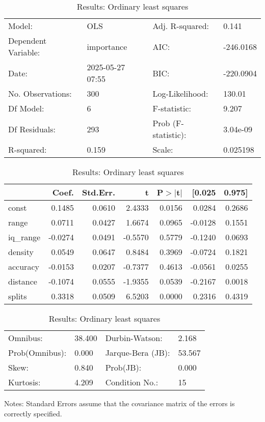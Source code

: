 \begin{table}
\caption{Results: Ordinary least squares}
\label{}
\begin{center}
\begin{tabular}{llll}
\hline
Model:              & OLS              & Adj. R-squared:     & 0.141      \\
Dependent Variable: & importance       & AIC:                & -246.0168  \\
Date:               & 2025-05-27 07:55 & BIC:                & -220.0904  \\
No. Observations:   & 300              & Log-Likelihood:     & 130.01     \\
Df Model:           & 6                & F-statistic:        & 9.207      \\
Df Residuals:       & 293              & Prob (F-statistic): & 3.04e-09   \\
R-squared:          & 0.159            & Scale:              & 0.025198   \\
\hline
\end{tabular}
\end{center}

\begin{center}
\begin{tabular}{lrrrrrr}
\hline
          &   Coef. & Std.Err. &       t & P$> |$t$|$ &  [0.025 & 0.975]  \\
\hline
const     &  0.1485 &   0.0610 &  2.4333 &      0.0156 &  0.0284 & 0.2686  \\
range     &  0.0711 &   0.0427 &  1.6674 &      0.0965 & -0.0128 & 0.1551  \\
iq\_range & -0.0274 &   0.0491 & -0.5570 &      0.5779 & -0.1240 & 0.0693  \\
density   &  0.0549 &   0.0647 &  0.8484 &      0.3969 & -0.0724 & 0.1821  \\
accuracy  & -0.0153 &   0.0207 & -0.7377 &      0.4613 & -0.0561 & 0.0255  \\
distance  & -0.1074 &   0.0555 & -1.9355 &      0.0539 & -0.2167 & 0.0018  \\
splits    &  0.3318 &   0.0509 &  6.5203 &      0.0000 &  0.2316 & 0.4319  \\
\hline
\end{tabular}
\end{center}

\begin{center}
\begin{tabular}{llll}
\hline
Omnibus:       & 38.400 & Durbin-Watson:    & 2.168   \\
Prob(Omnibus): & 0.000  & Jarque-Bera (JB): & 53.567  \\
Skew:          & 0.840  & Prob(JB):         & 0.000   \\
Kurtosis:      & 4.209  & Condition No.:    & 15      \\
\hline
\end{tabular}
\end{center}
\end{table}
\bigskip
Notes: \newline 
[1] Standard Errors assume that the covariance matrix of the errors is correctly specified.